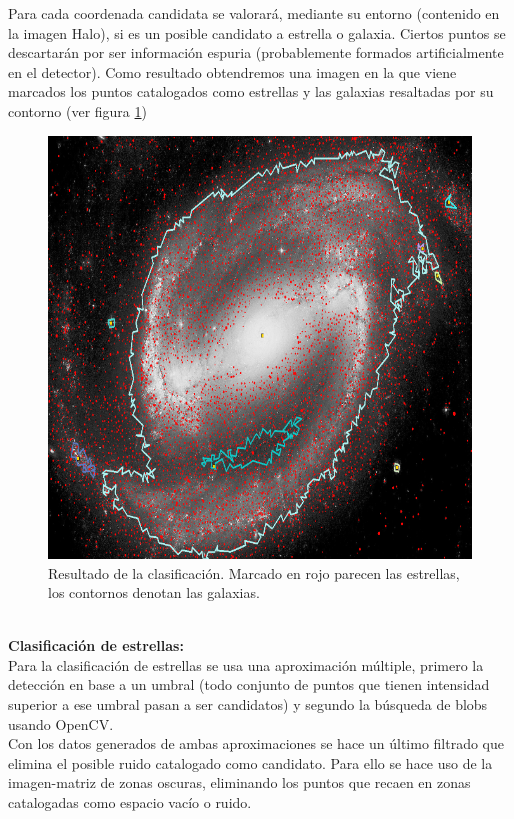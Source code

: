 	Para cada coordenada candidata se valorará, mediante su entorno (contenido en la imagen {\scriptsize Halo}), si es un posible candidato a estrella o galaxia. Ciertos puntos se descartarán por ser información espuria (probablemente formados artificialmente en el detector).
	Como resultado obtendremos una imagen en la que viene marcados los puntos catalogados como estrellas y las galaxias resaltadas por su contorno (ver figura \ref{fig:estrellasContornos})
	\begin{figure}[!htb]
		\centering
		\includegraphics[width=1\textwidth]{images/vectorClasifica.png}
		\caption{\label{fig:estrellasContornos}{\small Resultado de la clasificación. Marcado en rojo parecen las estrellas, los contornos denotan las galaxias.}}
	\end{figure}
	\\
	\textbf{Clasificación de estrellas:}
	\\Para la clasificación de estrellas se usa una aproximación múltiple, primero la detección en base a un umbral (todo conjunto de puntos que tienen intensidad superior a ese umbral pasan a ser candidatos) y segundo la búsqueda de blobs usando OpenCV.\\
	Con los datos generados de ambas aproximaciones se hace un último filtrado que elimina el posible ruido catalogado como candidato. Para ello se hace uso de la imagen-matriz de zonas oscuras, eliminando los puntos que recaen en zonas catalogadas como espacio vacío o ruido.

